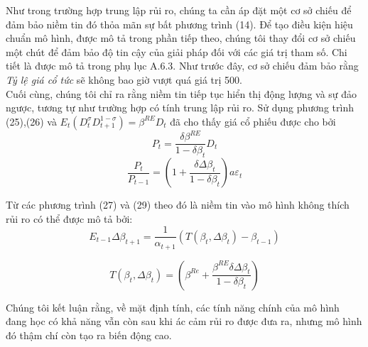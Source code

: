 \documentclass[10pt,a4paper]{article}
\begin{document}
	Như trong trường hợp trung lập rủi ro, chúng ta cần áp đặt một cơ sở chiếu để đảm bảo
	niềm tin đó thỏa mãn sự bất phương trình (14). Để tạo điều kiện hiệu chuẩn mô hình, được mô tả trong phần tiếp theo, chúng tôi thay đổi cơ sở chiếu một chút để đảm bảo
	độ tin cậy của giải pháp đối với các giá trị tham số. Chi tiết là được mô tả trong phụ lục A.6.3. Như trước đây, cơ sở chiếu đảm bảo rằng \textit{Tỷ lệ giá cổ tức} sẽ không bao giờ vượt quá giá trị 500.\\
	Cuối cùng, chúng tôi chỉ ra rằng niềm tin tiếp tục hiển thị động lượng và sự đảo ngược, tương tự như trường hợp có tính trung lập rủi ro. Sử dụng phương trình (25),(26) và $E_t(D^{\sigma}_{t}D^{1-\sigma}_{t+1})=\beta^{RE}D_t$ đã cho thấy giá cổ phiếu được cho bởi
	\begin{equation}
	P_t=\frac{\delta\beta^{RE}}{1-\delta\beta_t}D_t
	\end{equation}
	\begin{equation}
	\frac{P_t}{P_{t-1}}=\left(1+\frac{\delta\Delta\beta_t}{1-\delta\beta_t}\right)a\varepsilon_t
	\end{equation}
	
	Từ các phương trình (27) và (29) theo đó là niềm tin vào mô hình không thích rủi ro có thể được mô tả bởi:
	\begin{equation}
	E_{t-1}\Delta\beta_{t+1}=\frac{1}{\alpha_{t+1}}(T(\beta_t,\Delta\beta_t)-\beta_{t-1})
	\end{equation}
	
	\begin{equation}
	T(\beta_t,\Delta\beta_t)=\left(\beta^{Re}+\frac{\beta^{RE}\delta\Delta\beta_t}{1-\delta\beta_t}\right)
	\end{equation} 
	
	Chúng tôi kết luận rằng, về mặt định tính, các tính năng chính của mô hình đang học có khả năng vẫn còn sau khi ác cảm rủi ro được đưa ra, nhưng mô hình đó thậm chí còn tạo ra biến động cao.
\end{document}
